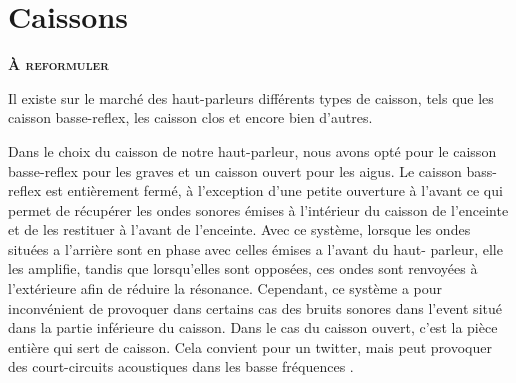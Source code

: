 \section{Caissons}

\textbf{\textsc{À reformuler}}

Il existe sur le marché des haut-parleurs
différents types de caisson, tels que
les caisson basse-reflex, les caisson clos et encore bien d’autres.

Dans le choix du caisson de notre haut-parleur,
nous avons opté pour le caisson basse-reflex pour les graves
et un caisson ouvert pour les aigus.
Le caisson bass-reflex est entièrement fermé, à l'exception d'une petite ouverture à l'avant ce qui permet de récupérer les ondes sonores émises à l'intérieur du caisson de l'enceinte et de les restituer à l'avant de l'enceinte.
Avec ce système, lorsque les ondes situées a l’arrière sont en phase
avec celles émises a l’avant du haut- parleur, elle les amplifie,
tandis que lorsqu’elles  sont opposées,
ces ondes sont renvoyées à l’extérieure afin de réduire la résonance\cite{US6275597}.
Cependant, ce système a pour inconvénient de provoquer dans certains cas
des bruits sonores dans l’event situé dans la partie inférieure du caisson.
Dans le cas du caisson ouvert, c'est la pièce entière qui sert de caisson. Cela convient pour un twitter, mais peut provoquer des court-circuits acoustiques dans les basse fréquences \cite{petoin}.